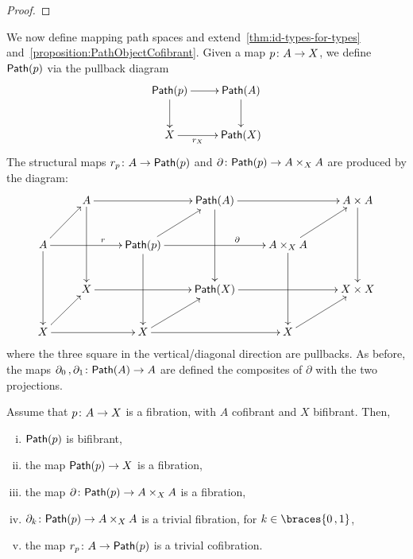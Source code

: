 \documentclass[reqno,10pt,a4paper,oneside,draft]{amsart}
\begin{document}
\begin{proof}
\end{proof}






We now define mapping path spaces and  extend~\cref{thm:id-types-for-types} and~\cref{proposition:PathObjectCofibrant}. Given a map $p \colon A \to X$, we define $\mathsf{Path}(p)$ 
via the pullback diagram
\[
\xymatrix{
\Path(p) \ar[r] \ar[d] & \Path(A) \ar[d] \\
X \ar[r]_-{r_X} & \Path(X) }
\]
The structural maps $r_p \colon A \rightarrow \mathsf{Path}(p)$ and $\partial \colon \mathsf{Path}(p) \rightarrow A \times_{X} A$ are produced by the diagram:
\[
\xymatrix{
& A \ar[rr] \ar[dd] & & \Path(A) \ar[rr] \ar[dd] & & A \times A \ar[dd] \\
A \ar[ur] \ar[rr]^(.6){r}  \ar[dd] & & \Path(p) \ar[ur] \ar[rr]^(.65){\partial} \ar[dd] & & A \times_{X} A \ar[ur] \ar[dd] \\
& X \ar[rr] & & \Path(X) \ar[rr] & & X \times X \\
X \ar[ur] \ar[rr] & & X \ar[rr] \ar[ur] & & X \ar[ur] \\ 
}
\]
where the three square in the vertical/diagonal direction are pullbacks. As before, the maps
$\partial_0 \, , \partial_1 \colon \mathsf{Path}(A) \to A$ are defined the composites of $\partial$
with the two projections. 


\begin{theorem}
\label{thm:MainPathObject}
Assume that $p \colon A \rightarrow X $ is a fibration, with $A$ cofibrant and $X$  bifibrant. Then,
\begin{enumerate}[(i)] 
\item \label{thm:MainPathObject:IdBifib} $\mathsf{Path}(p)$ is bifibrant, 
\item the map $\mathsf{Path}(p) \rightarrow X$ is a fibration,
\item the map $\partial \colon \mathsf{Path}(p) \rightarrow A \times_{X} A$ is a fibration,
\item $\partial_k \colon \mathsf{Path}(p) \rightarrow A \times_{X} A$  is a trivial fibration, for $k \in \braces{0 \, , 1 }$,
\item the map $r_p \colon A \rightarrow \mathsf{Path}(p)$ is a trivial cofibration.
\end{enumerate}
\end{theorem}
\end{document}

